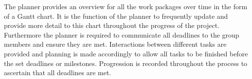 The planner provides an overview for all the work packages over time in the form of a Gantt chart. It is the function of the planner to frequently update and provide more detail to this chart throughout the progress of the project. Furthermore the planner is required to communicate all deadlines to the group members and ensure they are met. Interactions between different tasks are provided and planning is made accordingly to allow all tasks to be finished before the set deadlines or milestones. Progression is recorded throughout the process to ascertain that all deadlines are met. 

